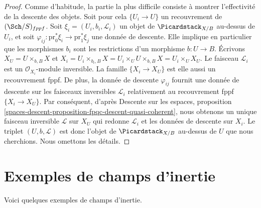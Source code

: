 \begin{proof}
Comme d'habitude, la partie la plus difficile consiste à montrer l'effectivité de la descente des objets.
Soit pour cela $\{U_i \to U\}$ un recouvrement de $(\Sch/S)_{fppf}$.
Soit $\xi_i = (U_i, b_i, \mathcal{L}_i)$ un objet de
$\Picardstack_{X/B}$ au-dessus de $U_i$, et soit
$\varphi_{ij} : \text{pr}_0^*\xi_i \to \text{pr}_1^*\xi_j$
une donnée de descente. Elle implique en particulier que les morphismes
$b_i$ sont les restrictions d'un morphisme $b : U \to B$.
Écrivons $X_U = U \times_{b, B} X$ et
$X_i = U_i \times_{b_i, B} X =
U_i \times_U U \times_{b, B} X = U_i \times_U X_U$.
Le faisceau $\mathcal{L}_i$ est un $\mathcal{O}_{X_i}$-module inversible.
La famille $\{X_i \to X_U\}$ est elle aussi un recouvrement fppf.
De plus, la donnée de descente $\varphi_{ij}$ fournit une
donnée de descente sur les faisceaux inversibles $\mathcal{L}_i$ relativement
au recouvrement fppf $\{X_i \to X_U\}$.
Par conséquent, d'après
Descente sur les espaces,
proposition \ref{spaces-descent-proposition-fpqc-descent-quasi-coherent},
nous obtenons un unique faisceau inversible $\mathcal{L}$ sur $X_U$
qui redonne $\mathcal{L}_i$ et les données de descente sur $X_i$.
Le triplet $(U, b, \mathcal{L})$ est donc l'objet de
$\Picardstack_{X/B}$ au-dessus de $U$ que nous cherchions.
Nous omettons les détails.
\end{proof}





\section{Exemples de champs d'inertie}
\label{section-examples-inertia}

\noindent
Voici quelques exemples de champs d'inertie.

